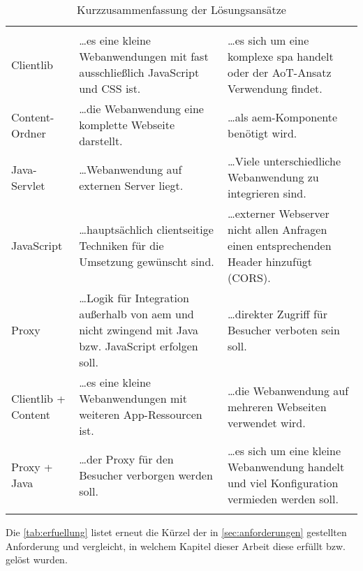 \begin{longtable}{|p{}|p{}|p{}|} 
	\hline 
	\thead{Lösungsansatz} & \thead{Gut wenn \dots} & \thead{Schlecht wenn \dots}\\ 
	\hhline{|=|=|=|}
	
	Clientlib
	&
	\dots es eine kleine Webanwendungen mit fast ausschließlich JavaScript und CSS ist.
	&
	\dots es sich um eine komplexe \ac{spa} handelt oder der AoT-Ansatz Verwendung findet.
	\\\hline 
	
	Content-Ordner
	& 
	\dots die Webanwendung eine komplette Webseite darstellt.
	&
	\dots als \ac{aem}-Komponente benötigt wird.
	\\\hline
	
	Java-Servlet
	& 
	\dots Webanwendung auf externen Server liegt.
	&
	\dots Viele unterschiedliche Webanwendung zu integrieren sind.
	\\\hline
	
	JavaScript
	&
	\dots hauptsächlich clientseitige Techniken für die Umsetzung gewünscht sind.
	&
	\dots externer Webserver nicht allen Anfragen einen entsprechenden Header hinzufügt (CORS).
	\\\hline
	
	Proxy
	&
	\dots Logik für Integration außerhalb von \ac{aem} und nicht zwingend mit Java bzw. JavaScript erfolgen soll.
	&
	\dots direkter Zugriff für Besucher verboten sein soll.
	\\\hline
	
	Clientlib + Content
	&
	\dots es eine kleine Webanwendungen mit weiteren App-Ressourcen ist.
	&
	\dots die Webanwendung auf mehreren Webseiten verwendet wird.
	\\\hline
	
	Proxy + Java
	&
	\dots der Proxy für den Besucher verborgen werden soll.
	&
	\dots es sich um eine kleine Webanwendung handelt und viel Konfiguration vermieden werden soll. 
	\\\hline
	
	\caption{Kurzzusammenfassung der Lösungsansätze}\label{tab:vergleich_loesungen}
\end{longtable}

Die \autoref{tab:erfuellung} listet erneut die Kürzel der in \autoref{sec:anforderungen} gestellten Anforderung und vergleicht, in welchem Kapitel dieser Arbeit diese erfüllt bzw. gelöst wurden.

